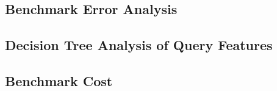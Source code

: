 \subsection{Benchmark Error Analysis}
\label{subsec:erroranalysis}




\subsection{Decision Tree Analysis of Query Features}
\label{subsec:dtrees}




\subsection{Benchmark Cost}
\label{sec:bmcost}






